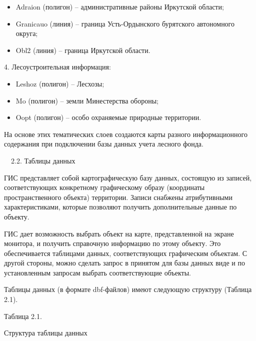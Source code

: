 \documentclass{report}
\begin{document}
\begin{itemize}
\item Adraion (полигон) – административные районы Иркутской области;
\item Granicauo (линия) – граница Усть-Ордынского бурятского автономного округа; 
\item Obl2 (линия) – граница Иркутской области.
\end{itemize}
4. Лесоустроительная информация:

\begin{itemize}
\item Leshoz (полигон)  – Лесхозы;
\item Mo (полигон) – земли Минестерства обороны;
\item Oopt (полигон) – особо охраняемые природные территории. 
\end{itemize}
На основе этих тематических слоев создаются карты разного информационного содержания при подключении базы данных учета
лесного фонда. 

\ \ 2.2. Таблицы данных 

ГИС представляет собой картографическую базу данных, состоящую из записей, соответствующих конкретному графическому
образу (координаты пространственного объекта) территории. Записи снабжены атрибутивными характеристиками, которые
позволяют получить дополнительные данные по объекту.

ГИС дает возможность выбрать объект на карте, представленной на экране монитора, и получить справочную информацию по
этому объекту. Это обеспечивается таблицами данных, соответствующих графическим объектам. С другой стороны, можно
сделать запрос в принятом для базы данных виде и по установленным запросам выбрать соответствующие объекты.

Таблицы данных (в формате dbf{}-файлов) имеют следующую структуру (Таблица 2.1).

Таблица 2.1. 

Структура таблицы данных
\end{document}
